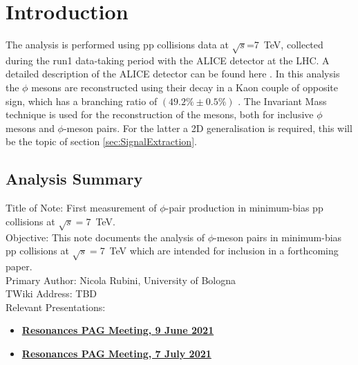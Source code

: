\section{Introduction}
\label{sec:Introduction}
The analysis is performed using pp collisions data at $\sqrt{s}$=\SI{7}{\tera\electronvolt}, collected during the run1 data-taking period with the ALICE detector at the LHC. A detailed description of the ALICE detector can be found here \cite{Collaboration_2008}. In this analysis the $\phi$ mesons are reconstructed using their decay in a Kaon couple of opposite sign, which has a branching ratio of $(49.2\%\pm 0.5\%)$ \cite{PDG}. The Invariant Mass technique is used for the reconstruction of the mesons, both for inclusive $\phi$ mesons and $\phi$-meson pairs. For the latter a 2D generalisation is required, this will be the topic of section \ref{sec:SignalExtraction}.\\

\subsection{Analysis Summary}
Title of Note: First measurement of $\phi$-pair production in minimum-bias pp collisions at $\sqrt{s}=$\SI{7}{\tera\electronvolt}.\\
Objective: This note documents the analysis of $\phi$-meson pairs in minimum-bias pp collisions at $\sqrt{s}=$\SI{7}{\tera\electronvolt} which are intended for inclusion in a forthcoming paper.\\
Primary Author: Nicola Rubini, University of Bologna\\
TWiki Address: TBD\\
Relevant Presentations:
\begin{itemize}
\item \href{https://indico.cern.ch/event/1046617/}{\bf{Resonances PAG Meeting, 9 June 2021}}
\item \href{https://indico.cern.ch/event/1052315/}{\bf{Resonances PAG Meeting, 7 July 2021}}
\end{itemize}

